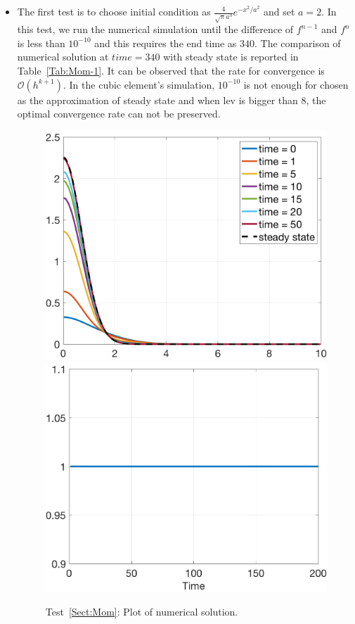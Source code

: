 \documentclass[preprint,11pt]{elsarticle}
\begin{document}
\begin{itemize}
\item The first test is to choose initial condition as $\frac{4}{\sqrt{\pi}a^3}e^{-x^2/a^2}$ and set $a=2$.
In this test, we run the numerical simulation until the difference of $f^{n-1}$ and $f^n$ is less than $10^{-10}$ and this requires the end time as $340$. The comparison of numerical solution at $time = 340$ with steady state is reported in Table~\ref{Tab:Mom-1}. It can be observed that the rate for convergence is $\mathcal{O}(h^{k+1})$. In the cubic element's simulation, $10^{-10}$ is not enough for chosen as the approximation of steady state and when lev is bigger than 8, the optimal convergence rate can not be preserved.
\begin{figure}[H]
\centering
\includegraphics[width=.48\textwidth]{./NumFig/Ini-Mom-1}
\includegraphics[width=.48\textwidth]{./NumFig/Ini-Mom-1-Conv.png}
\caption{Test~\ref{Sect:Mom}: Plot of numerical solution.}\label{Fig:Mom-1}
\end{figure}


\end{itemize}
\end{document}

